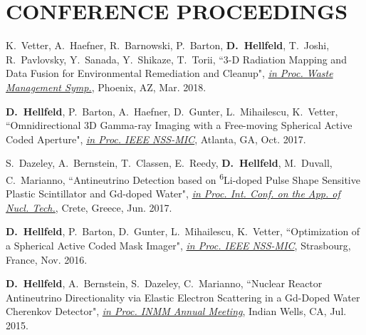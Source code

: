 \section{\small{CONFERENCE PROCEEDINGS}}

 \begin{thebibliography}{3}
 \raggedright
 \vspace{10pt}
 
 K.~Vetter, A.~Haefner, R.~Barnowski, P.~Barton, \textbf{D.~Hellfeld}, T.~Joshi, R.~Pavlovsky, Y.~Sanada, Y.~Shikaze, T.~Torii, ``3-D Radiation Mapping and Data Fusion for Environmental Remediation and Cleanup", \href{http://www.xcdsystem.com/wmsym/2018/index.html}{\emph{in Proc. Waste Management Symp.}}, Phoenix, AZ, Mar. 2018.


 \textbf{D.~Hellfeld}, P.~Barton, A.~Haefner, D.~Gunter, L.~Mihailescu, K.~Vetter, ``Omnidirectional 3D Gamma-ray Imaging with a Free-moving Spherical Active Coded Aperture", \href{http://ewh.ieee.org/soc/nps/nss-mic/2017/News.html}{\emph{in Proc. IEEE NSS-MIC}}, Atlanta, GA, Oct. 2017.


  S.~Dazeley, A.~Bernstein, T.~Classen, E.~Reedy, \textbf{D.~Hellfeld}, M.~Duvall, C.~Marianno, ``Antineutrino Detection based on \textsuperscript{6}Li-doped Pulse Shape Sensitive Plastic Scintillator and Gd-doped Water", \href{http://www.creteconf.org/index.html}{\emph{in Proc. Int. Conf. on the App. of Nucl. Tech.}}, Crete, Greece, Jun. 2017. 
 
  \textbf{D.~Hellfeld}, P.~Barton, D.~Gunter, L.~Mihailescu, K.~Vetter, ``Optimization of a Spherical Active Coded Mask Imager", \href{http://ieeexplore.ieee.org/document/8069853/}{\emph{in Proc. IEEE NSS-MIC}}, Strasbourg, France, Nov. 2016. 
 
  \textbf{D.~Hellfeld}, A.~Bernstein, S.~Dazeley, C.~Marianno, ``Nuclear Reactor Antineutrino Directionality via Elastic Electron Scattering in a Gd-Doped Water Cherenkov Detector", \href{https://www.inmm.org/INMM-Resources/Proceedings-Presentations/Annual-Meeting-Proceedings}{\emph{in Proc. INMM Annual Meeting}}, Indian Wells, CA, Jul. 2015. 
 
 \end{thebibliography}
